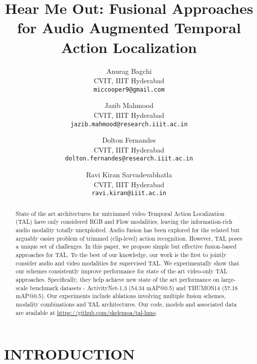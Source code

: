 \documentclass[10pt,twocolumn,letterpaper]{article}
\begin{document}
\title{Hear Me Out: Fusional Approaches for Audio Augmented Temporal Action Localization}

\author{Anurag Bagchi\\
CVIT, IIIT Hyderabad\\
{\tt\small miccooper9@gmail.com}
\and
Jazib Mahmood\\
CVIT, IIIT Hyderabad\\
{\tt\small jazib.mahmood@research.iiit.ac.in}
\and
Dolton Fernandes\\
CVIT, IIIT Hyderabad\\
{\tt\small dolton.fernandes@research.iiit.ac.in}
\and
Ravi Kiran Sarvadevabhatla\\
CVIT, IIIT Hyderabad\\
{\tt\small ravi.kiran@iiit.ac.in}
}

\maketitle


\begin{abstract}
   State of the art architectures for untrimmed video Temporal Action Localization (TAL) have only considered RGB and Flow modalities, leaving the information-rich audio modality totally unexploited. Audio fusion has been explored for the related but arguably easier problem of trimmed (clip-level) action recognition. However, TAL poses a unique set of challenges. In this paper, we propose simple but effective fusion-based approaches for TAL. To the best of our knowledge, our work is the first to jointly consider audio and video modalities for supervised TAL. We experimentally show that our schemes consistently improve performance for state of the art video-only TAL approaches. Specifically, they help achieve new state of the art performance on large-scale benchmark datasets - ActivityNet-1.3 (54.34 mAP@0.5) and THUMOS14 (57.18 mAP@0.5). Our experiments include ablations involving multiple fusion schemes, modality combinations and TAL architectures. Our code, models and associated data are available at \url{https://github.com/skelemoa/tal-hmo}. 
\end{abstract}



\section{\uppercase{Introduction}}
\label{sec:introduction}
\end{document}
